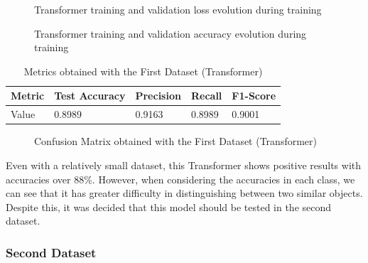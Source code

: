 \begin{figure}[H]
    \centering
    {\fontsize{10}{12}\selectfont}
    \caption[Transformer training and validation loss evolution during training]{Transformer training and validation loss evolution during training}
    \label{fig:transformer_dataset1_loss}
\end{figure}

\begin{figure}[H]
    \centering
    {\fontsize{10}{12}\selectfont}
    \caption[Transformer training and validation accuracy evolution during training]{Transformer training and validation accuracy evolution during training}
    \label{fig:transformer_dataset1_acc}
\end{figure}

\begin{table}[H]
    \centering
    \caption{Metrics obtained with the First Dataset (Transformer)}
    \label{table:transformer_dataset1_results}
    \begin{tabular}{|l|l|l|l|l|}
        \hline
        Metric & Test Accuracy & Precision & Recall & F1-Score \\
        \hline
        Value & 0.8989 & 0.9163 & 0.8989 & 0.9001 \\
        \hline
    \end{tabular}
\end{table}

\begin{figure}[H]
    \centering
    {\fontsize{10}{12}\selectfont}
    \caption[Confusion Matrix obtained with the First Dataset (Transformer)]{Confusion Matrix obtained with the First Dataset (Transformer)}
    \label{fig:transformer_dataset1_confusion_matrix}
\end{figure}

Even with a relatively small dataset, this Transformer shows positive results with accuracies over 88\%. However, when considering the accuracies in each class, we can see that it has greater difficulty in distinguishing between two similar objects. Despite this, it was decided that this model should be tested in the second dataset.

\subsubsection{Second Dataset}

